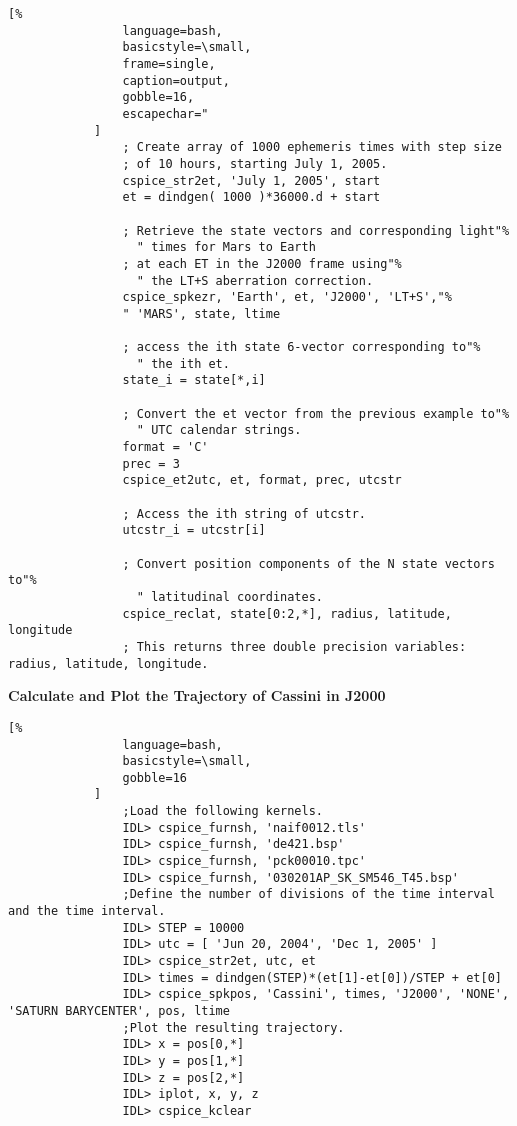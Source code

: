 \documentclass[crop=false,class=article,oneside]{standalone}
\begin{document}
            \begin{lstlisting}[%
                language=bash,
                basicstyle=\small,
                frame=single,
                caption=output,
                gobble=16,
                escapechar="
            ]
                ; Create array of 1000 ephemeris times with step size
                ; of 10 hours, starting July 1, 2005.
                cspice_str2et, 'July 1, 2005', start
                et = dindgen( 1000 )*36000.d + start

                ; Retrieve the state vectors and corresponding light"%
                  " times for Mars to Earth
                ; at each ET in the J2000 frame using"%
                  " the LT+S aberration correction.
                cspice_spkezr, 'Earth', et, 'J2000', 'LT+S',"%
                " 'MARS', state, ltime
    
                ; access the ith state 6-vector corresponding to"%
                  " the ith et.
                state_i = state[*,i]

                ; Convert the et vector from the previous example to"%
                  " UTC calendar strings.
                format = 'C'
                prec = 3
                cspice_et2utc, et, format, prec, utcstr

                ; Access the ith string of utcstr.
                utcstr_i = utcstr[i]

                ; Convert position components of the N state vectors to"%
                  " latitudinal coordinates.
                cspice_reclat, state[0:2,*], radius, latitude, longitude
                ; This returns three double precision variables: radius, latitude, longitude.
            \end{lstlisting}
            \textbf{Calculate and Plot the Trajectory of Cassini in J2000}
            \begin{lstlisting}[%
                language=bash,
                basicstyle=\small,
                gobble=16
            ]
                ;Load the following kernels.
                IDL> cspice_furnsh, 'naif0012.tls'
                IDL> cspice_furnsh, 'de421.bsp'
                IDL> cspice_furnsh, 'pck00010.tpc'
                IDL> cspice_furnsh, '030201AP_SK_SM546_T45.bsp' 
                ;Define the number of divisions of the time interval and the time interval.
                IDL> STEP = 10000
                IDL> utc = [ 'Jun 20, 2004', 'Dec 1, 2005' ]
                IDL> cspice_str2et, utc, et
                IDL> times = dindgen(STEP)*(et[1]-et[0])/STEP + et[0]
                IDL> cspice_spkpos, 'Cassini', times, 'J2000', 'NONE', 'SATURN BARYCENTER', pos, ltime
                ;Plot the resulting trajectory.
                IDL> x = pos[0,*]
                IDL> y = pos[1,*]
                IDL> z = pos[2,*]
                IDL> iplot, x, y, z
                IDL> cspice_kclear
            \end{lstlisting}
\end{document}
